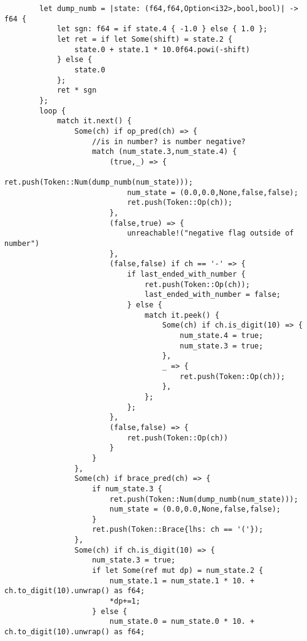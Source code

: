 \begin{verbatim}
        let dump_numb = |state: (f64,f64,Option<i32>,bool,bool)| -> f64 {
            let sgn: f64 = if state.4 { -1.0 } else { 1.0 };
            let ret = if let Some(shift) = state.2 {
                state.0 + state.1 * 10.0f64.powi(-shift)
            } else {
                state.0
            };
            ret * sgn
        };
        loop {
            match it.next() {
                Some(ch) if op_pred(ch) => {
                    //is in number? is number negative?
                    match (num_state.3,num_state.4) {
                        (true,_) => {
                            ret.push(Token::Num(dump_numb(num_state)));
                            num_state = (0.0,0.0,None,false,false);
                            ret.push(Token::Op(ch));
                        },
                        (false,true) => {
                            unreachable!("negative flag outside of number")
                        },
                        (false,false) if ch == '-' => {
                            if last_ended_with_number {
                                ret.push(Token::Op(ch));
                                last_ended_with_number = false;
                            } else {
                                match it.peek() {
                                    Some(ch) if ch.is_digit(10) => {
                                        num_state.4 = true;
                                        num_state.3 = true;
                                    },
                                    _ => {
                                        ret.push(Token::Op(ch));
                                    },
                                };
                            };
                        },
                        (false,false) => {
                            ret.push(Token::Op(ch))
                        }
                    }
                },
                Some(ch) if brace_pred(ch) => {
                    if num_state.3 {
                        ret.push(Token::Num(dump_numb(num_state)));
                        num_state = (0.0,0.0,None,false,false);
                    }
                    ret.push(Token::Brace{lhs: ch == '('});
                },
                Some(ch) if ch.is_digit(10) => {
                    num_state.3 = true;
                    if let Some(ref mut dp) = num_state.2 {
                        num_state.1 = num_state.1 * 10. + ch.to_digit(10).unwrap() as f64;
                        *dp+=1;
                    } else {
                        num_state.0 = num_state.0 * 10. + ch.to_digit(10).unwrap() as f64;

\end{verbatim}
